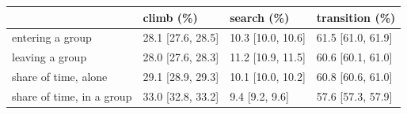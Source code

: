 \begin{tabular}{@{}l l l l@{}}
\toprule
 & climb (\%) & search (\%) & transition (\%) \\
\midrule
entering a group & 28.1 [27.6, 28.5] & 10.3 [10.0, 10.6] & 61.5 [61.0, 61.9] \\
leaving a group & 28.0 [27.6, 28.3] & 11.2 [10.9, 11.5] & 60.6 [60.1, 61.0] \\
share of time, alone & 29.1 [28.9, 29.3] & 10.1 [10.0, 10.2] & 60.8 [60.6, 61.0] \\
share of time, in a group & 33.0 [32.8, 33.2] & 9.4 [9.2, 9.6] & 57.6 [57.3, 57.9] \\
\bottomrule
\end{tabular}
